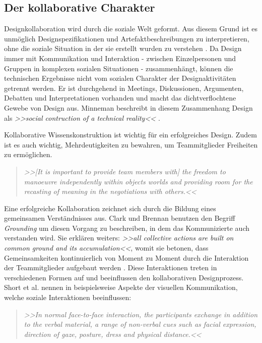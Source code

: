 \subsection{Der kollaborative Charakter} 
Designkollaboration wird durch die soziale Welt geformt. Aus diesem Grund ist es unmöglich Designspezifikationen und Artefaktbeschreibungen zu interpretieren, ohne die soziale Situation in der sie erstellt wurden zu verstehen \citep{Brown:2002}. Da Design immer mit Kommunikation und Interaktion - zwischen Einzelpersonen und Gruppen in komplexen sozialen Situationen - zusammenhängt, können die technischen Ergebnisse nicht vom sozialen Charakter der Designaktivitäten getrennt werden. Er ist durchgehend in Meetings, Diskussionen, Argumenten, Debatten und Interpretationen vorhanden und macht das dichtverflochtene Gewebe von Design aus. Minneman beschreibt in diesem Zusammenhang Design als \emph{>>social contruction of a technical reality<<} \citep{Minneman:1991}.

\medskip Kollaborative Wissenskonstruktion ist wichtig für ein erfolgreiches Design. Zudem ist es auch wichtig, Mehrdeutigkeiten zu bewahren, um Teammitglieder Freiheiten zu ermöglichen.

\begin{quote}
	\textsl{>>[It is important to provide team members with] the freedom to manoeuvre independently within objects worlds and providing room for the recasting of meaning in the negotiations with others.<<}
\begin{flushright}\citep{Bucciarelli:1994}\end{flushright}
\end{quote}

\medskip Eine erfolgreiche Kollaboration zeichnet sich durch die Bildung eines gemeinsamen Verständnisses aus. Clark und Brennan benutzen den Begriff \emph{Grounding} um diesen Vorgang zu beschreiben, in dem das Kommunizierte auch verstanden wird. Sie erklären weiters: \emph{>>all collective actions are built on common ground and its accumulation<<}, womit sie betonen, dass Gemeinsamkeiten kontinuierlich von Moment zu Moment durch die Interaktion der Teammitglieder aufgebaut werden \citep{Clark:1991}. Diese Interaktionen treten in verschiedenen Formen auf und beeinflussen den kollaborativen Designprozess. Short et al. nennen in \citep{Short:1991} beispielsweise Aspekte der visuellen Kommunikation, welche soziale Interaktionen beeinflussen: 

\begin{quote}
	\textsl{>>In normal face-to-face interaction, the participants exchange in addition to the verbal material, a range of non-verbal cues such as facial expression, direction of gaze, posture, dress and physical distance.<<}
\begin{flushright}\citep{Short:1991}\end{flushright}
\end{quote}

